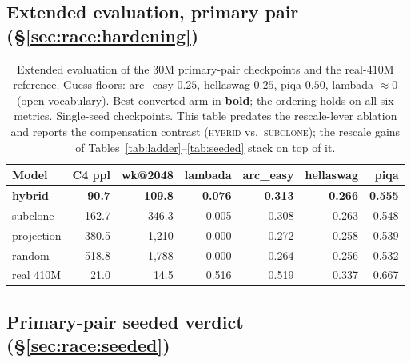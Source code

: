 \subsection{Extended evaluation, primary pair (\S\ref{sec:race:hardening})}
\label{app:extended}

\begin{table}[h]
\centering
\caption{Extended evaluation of the 30M primary-pair checkpoints and the
real-410M reference. Guess floors: arc\_easy $0.25$, hellaswag $0.25$, piqa
$0.50$, lambada $\approx0$ (open-vocabulary). Best converted arm in
\textbf{bold}; the ordering holds on all six metrics. Single-seed checkpoints.
This table predates the rescale-lever ablation and reports the compensation
contrast (\textsc{hybrid} vs.\ \textsc{subclone}); the rescale gains of
Tables~\ref{tab:ladder}--\ref{tab:seeded} stack on top of it.}
\label{tab:extended}
\begin{tabular}{lrrrrrr}
\toprule
Model & C4 ppl & wk@2048 & lambada & arc\_easy & hellaswag & piqa \\
\midrule
\textbf{hybrid} & \textbf{90.7} & \textbf{109.8} & \textbf{0.076} & \textbf{0.313} & \textbf{0.266} & \textbf{0.555} \\
subclone        & 162.7 & 346.3 & 0.005 & 0.308 & 0.263 & 0.548 \\
projection      & 380.5 & 1{,}210 & 0.000 & 0.272 & 0.258 & 0.539 \\
random          & 518.8 & 1{,}788 & 0.000 & 0.264 & 0.256 & 0.532 \\
\midrule
real 410M       & 21.0 & 14.5 & 0.516 & 0.519 & 0.337 & 0.667 \\
\bottomrule
\end{tabular}
\end{table}

\subsection{Primary-pair seeded verdict (\S\ref{sec:race:seeded})}
\label{app:seeded}

